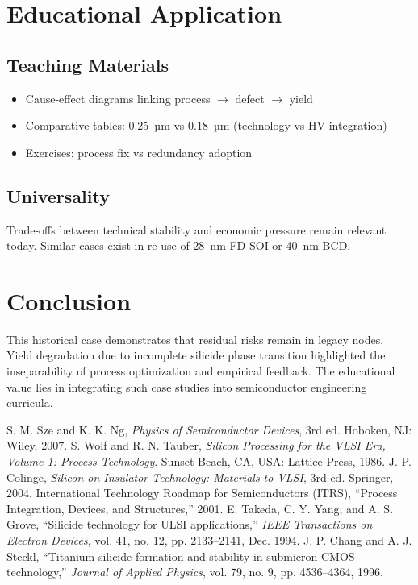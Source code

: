 \documentclass[conference]{IEEEtran}
\begin{document}
\section{Educational Application}
\subsection{Teaching Materials}
\begin{itemize}
    \item Cause-effect diagrams linking process $\rightarrow$ defect $\rightarrow$ yield
    \item Comparative tables: 0.25~µm vs 0.18~µm (technology vs HV integration)
    \item Exercises: process fix vs redundancy adoption
\end{itemize}

\subsection{Universality}
Trade-offs between technical stability and economic pressure remain relevant today. 
Similar cases exist in re-use of 28~nm FD-SOI or 40~nm BCD.

\section{Conclusion}
This historical case demonstrates that residual risks remain in legacy nodes. 
Yield degradation due to incomplete silicide phase transition highlighted the inseparability of process optimization and empirical feedback. 
The educational value lies in integrating such case studies into semiconductor engineering curricula.

\begin{thebibliography}{99}
 S. M. Sze and K. K. Ng, \textit{Physics of Semiconductor Devices}, 3rd ed. Hoboken, NJ: Wiley, 2007.
 S. Wolf and R. N. Tauber, \textit{Silicon Processing for the VLSI Era, Volume 1: Process Technology}. Sunset Beach, CA, USA: Lattice Press, 1986.
 J.-P. Colinge, \textit{Silicon-on-Insulator Technology: Materials to VLSI}, 3rd ed. Springer, 2004.
 International Technology Roadmap for Semiconductors (ITRS), ``Process Integration, Devices, and Structures,'' 2001.
 E. Takeda, C. Y. Yang, and A. S. Grove, ``Silicide technology for ULSI applications,'' \textit{IEEE Transactions on Electron Devices}, vol. 41, no. 12, pp. 2133--2141, Dec. 1994.
 J. P. Chang and A. J. Steckl, ``Titanium silicide formation and stability in submicron CMOS technology,'' \textit{Journal of Applied Physics}, vol. 79, no. 9, pp. 4536--4364, 1996.
\end{thebibliography}
\end{document}
